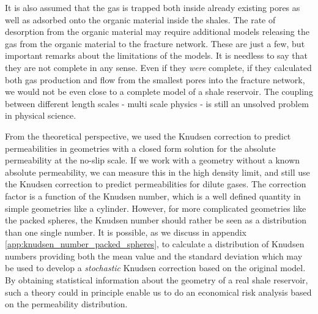 It is also assumed that the gas is trapped both inside already existing pores as well as adsorbed onto the organic material inside the shales. The rate of desorption from the organic material may require additional models releasing the gas from the organic material to the fracture network. These are just a few, but important remarks about the limitations of the models. It is needless to say that they are not complete in any sense. Even if they \textit{were} complete, if they calculated both gas production and flow from the smallest pores into the fracture network, we would not be even close to a complete model of a shale reservoir. The coupling between different length scales - multi scale physics - is still an unsolved problem in physical science.

From the theoretical perspective, we used the Knudsen correction to predict permeabilities in geometries with a closed form solution for the absolute permeability at the no-slip scale. If we work with a geometry without a known absolute permeability, we can measure this in the high density limit, and still use the Knudsen correction to predict permeabilities for dilute gases. The correction factor is a function of the Knudsen number, which is a well defined quantity in simple geometries like a cylinder. However, for more complicated geometries like the packed spheres, the Knudsen number should rather be seen as a distribution than one single number. It is possible, as we discuss in appendix \ref{app:knudsen_number_packed_spheres}, to calculate a distribution of Knudsen numbers providing both the mean value and the standard deviation which may be used to develop a \textit{stochastic} Knudsen correction based on the original model. By obtaining statistical information about the geometry of a real shale reservoir, such a theory could in principle enable us to do an economical risk analysis based on the permeability distribution. 
